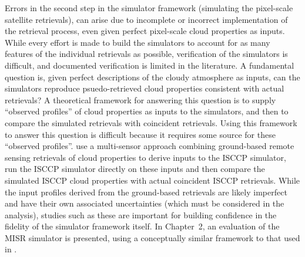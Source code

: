 Errors in the second step in the simulator framework (simulating the
pixel-scale satellite retrievals), can arise due to incomplete or
incorrect implementation of the retrieval process, even given perfect
pixel-scale cloud properties as inputs. While every effort is made to
build the simulators to account for as many features of the individual
retrievals as possible, verification of the simulators is difficult, and
documented verification is limited in the literature. A fundamental
question is, given perfect descriptions of the cloudy atmosphere as
inputs, can the simulators reproduce psuedo-retrieved cloud properties
consistent with actual retrievals? A theoretical framework for answering
this question is to supply ``observed profiles'' of cloud properties as
inputs to the simulators, and then to compare the simulated retrievals
with coincident retrievals. Using this framework to answer this question
is difficult because it requires some source for these ``observed
profiles''. \citet{mace_et_al_2011} use a multi-sensor approach
combining ground-based remote sensing retrievals of cloud properties to
derive inputs to the ISCCP simulator, run the ISCCP simulator directly
on these inputs and then compare the simulated ISCCP cloud properties
with actual coincident ISCCP retrievals. While the input profiles
derived from the ground-based retrievals are likely imperfect and have
their own associated uncertainties (which must be considered in the
analysis), studies such as these are important for building confidence
in the fidelity of the simulator framework itself. In Chapter~2, an
evaluation of the MISR simulator is presented, using a conceptually
similar framework to that used in \citet{mace_et_al_2011}.
